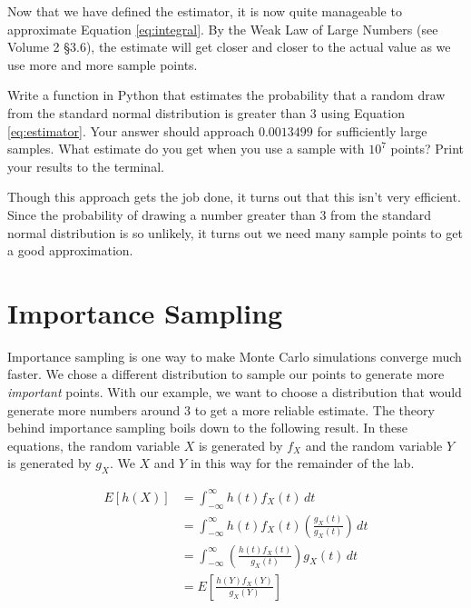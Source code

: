 Now that we have defined the estimator, it is now quite manageable to approximate Equation \ref{eq:integral}. By the Weak Law of Large Numbers (see Volume 2 \S 3.6), the estimate will get closer and closer to the actual value as we use more and more sample points.

\begin{problem} \label{prob:mc}
Write a function in Python that estimates the probability that a random draw from the standard normal distribution is greater than 3 using Equation \ref{eq:estimator}. Your answer should approach $0.0013499$ for sufficiently large samples. What estimate do you get when you use a sample with $10^7$ points? Print your results to the terminal.
\end{problem}

Though this approach gets the job done, it turns out that this isn't very efficient. Since the probability of drawing a number greater than $3$ from the standard normal distribution is so unlikely, it turns out we need many sample points to get a good approximation.

\section*{Importance Sampling}
Importance sampling is one way to make Monte Carlo simulations converge much faster. We chose a different distribution to sample our points to generate more \emph{important} points. With our example, we want to choose a distribution that would generate more numbers around $3$ to get a more reliable estimate. The theory behind importance sampling boils down to the following result. In these equations, the random variable $X$ is generated by $f_X$ and the random variable $Y$ is generated by $g_X$. We $X$ and $Y$ in this way for the remainder of the lab.

\begin{equation} \label{eq:importance}
\begin{split}
E[h(X)] & = \int_{-\infty}^{\infty} h(t)f_X(t)\,dt \\
& = \int_{-\infty}^{\infty} h(t)f_X(t)\left ( \frac{g_X(t)}{g_X(t)} \right )\,dt \\
& = \int_{-\infty}^{\infty} \left ( \frac{h(t)f_X(t)}{g_X(t)} \right )g_X(t)\,dt \\
& = E\left [ \frac{h(Y)f_X(Y)}{g_X(Y)}\right ]
\end{split}
\end{equation}

